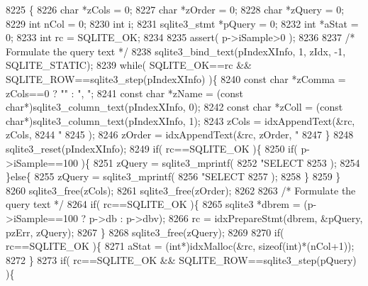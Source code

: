 \begin{DoxyCode}
8225  \{
8226   \textcolor{keywordtype}{char} *zCols = 0;
8227   \textcolor{keywordtype}{char} *zOrder = 0;
8228   \textcolor{keywordtype}{char} *zQuery = 0;
8229   \textcolor{keywordtype}{int} nCol = 0;
8230   \textcolor{keywordtype}{int} i;
8231   sqlite3_stmt *pQuery = 0;
8232   \textcolor{keywordtype}{int} *aStat = 0;
8233   \textcolor{keywordtype}{int} rc = SQLITE_OK;
8234 
8235   assert( p->iSample>0 );
8236 
8237   \textcolor{comment}{/* Formulate the query text */}
8238   sqlite3_bind_text(pIndexXInfo, 1, zIdx, -1, SQLITE_STATIC);
8239   \textcolor{keywordflow}{while}( SQLITE_OK==rc && SQLITE_ROW==sqlite3_step(pIndexXInfo) )\{
8240     \textcolor{keyword}{const} \textcolor{keywordtype}{char} *zComma = zCols==0 ? \textcolor{stringliteral}{""} : \textcolor{stringliteral}{", "};
8241     \textcolor{keyword}{const} \textcolor{keywordtype}{char} *zName = (\textcolor{keyword}{const} \textcolor{keywordtype}{char}*)sqlite3_column_text(pIndexXInfo, 0);
8242     \textcolor{keyword}{const} \textcolor{keywordtype}{char} *zColl = (\textcolor{keyword}{const} \textcolor{keywordtype}{char}*)sqlite3_column_text(pIndexXInfo, 1);
8243     zCols = idxAppendText(&rc, zCols, 
8244         \textcolor{stringliteral}{"%
8245     );
8246     zOrder = idxAppendText(&rc, zOrder, \textcolor{stringliteral}{"%
8247   \}
8248   sqlite3_reset(pIndexXInfo);
8249   \textcolor{keywordflow}{if}( rc==SQLITE_OK )\{
8250     \textcolor{keywordflow}{if}( p->iSample==100 )\{
8251       zQuery = sqlite3_mprintf(
8252           \textcolor{stringliteral}{"SELECT %
8253       );
8254     \}\textcolor{keywordflow}{else}\{
8255       zQuery = sqlite3_mprintf(
8256           \textcolor{stringliteral}{"SELECT %
8257       );
8258     \}
8259   \}
8260   sqlite3_free(zCols);
8261   sqlite3_free(zOrder);
8262 
8263   \textcolor{comment}{/* Formulate the query text */}
8264   \textcolor{keywordflow}{if}( rc==SQLITE_OK )\{
8265     sqlite3 *dbrem = (p->iSample==100 ? p->db : p->dbv);
8266     rc = idxPrepareStmt(dbrem, &pQuery, pzErr, zQuery);
8267   \}
8268   sqlite3_free(zQuery);
8269 
8270   \textcolor{keywordflow}{if}( rc==SQLITE_OK )\{
8271     aStat = (\textcolor{keywordtype}{int}*)idxMalloc(&rc, \textcolor{keyword}{sizeof}(\textcolor{keywordtype}{int})*(nCol+1));
8272   \}
8273   \textcolor{keywordflow}{if}( rc==SQLITE_OK && SQLITE_ROW==sqlite3_step(pQuery) )\{
}}}}
\end{DoxyCode}
